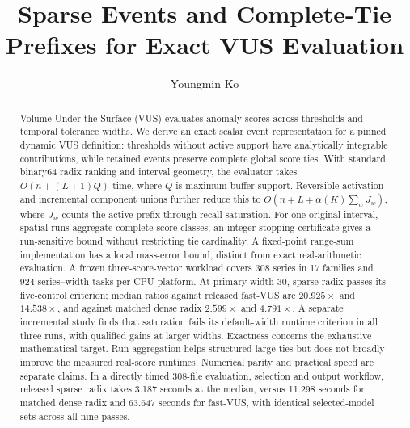 \documentclass[sigconf,nonacm]{acmart}
\begin{document}
\title{Sparse Events and Complete-Tie Prefixes for Exact VUS Evaluation}
\author{Youngmin Ko}
\begin{abstract}
Volume Under the Surface (VUS) evaluates anomaly scores across thresholds
and temporal tolerance widths. We derive an exact scalar event representation
for a pinned dynamic VUS definition: thresholds without active support have
analytically integrable contributions, while retained events preserve complete
global score ties. With standard binary64 radix ranking and interval geometry,
the evaluator takes $O(n+(L+1)Q)$ time, where $Q$ is maximum-buffer support.
Reversible activation and incremental component unions further reduce this to
$O(n+L+\alpha(K)\sum_wJ_w)$, where $J_w$ counts the active prefix through
recall saturation. For one original interval, spatial runs aggregate complete
score classes; an integer stopping certificate gives a run-sensitive bound
without restricting tie cardinality. A fixed-point range-sum implementation
has a local mass-error bound, distinct from exact real-arithmetic evaluation.
A frozen three-score-vector workload covers 308 series in 17 families and
924 series--width tasks per CPU platform. At primary width 30, sparse radix
passes its five-control criterion; median ratios against released fast-VUS
are $20.925\times$ and $14.538\times$, and against matched dense radix
$2.599\times$ and $4.791\times$. A separate incremental study finds that
saturation fails its default-width runtime criterion in all three runs,
with qualified gains at larger widths. Exactness concerns the exhaustive
mathematical target. Run aggregation helps structured large ties but does not
broadly improve the measured real-score runtimes. Numerical parity and
practical speed are separate claims. In a directly timed 308-file evaluation,
selection and output workflow, released sparse radix takes 3.187 seconds at the median, versus
11.298 seconds for matched dense radix and 63.647 seconds for fast-VUS,
with identical selected-model sets across all nine passes.
\end{abstract}
\maketitle
\vldbtopmatter



\end{document}
